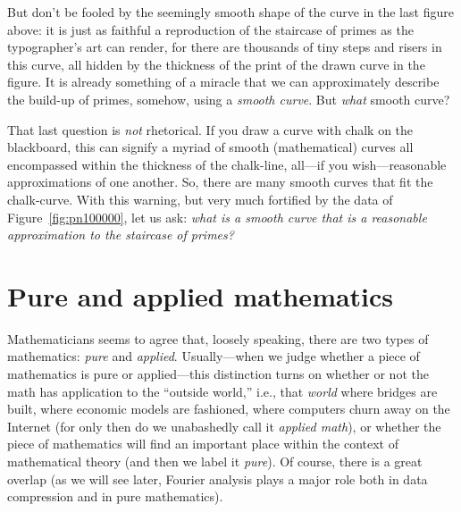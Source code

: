\documentclass[openany]{book}
\theoremstyle{plain}
\theoremstyle{definition}
\begin{document}
But don't be fooled by the seemingly smooth shape of the curve in the
last figure above: it is just as faithful a reproduction of the
staircase of primes as the typographer's art can render, for there are
thousands of tiny steps and risers in this curve, all hidden by the
thickness of the print of the drawn curve in the figure.  It is
already something of a miracle that we can approximately describe the
build-up of primes, somehow, using a {\em smooth curve}.  But {\em
  what} smooth curve?


That last question is {\em not} rhetorical. If you draw a curve with
chalk on the blackboard, this can signify a myriad of smooth
(mathematical) curves all encompassed within the thickness of the
chalk-line, all---if you wish---reasonable approximations of one
another. So, there are many smooth curves that fit the chalk-curve.
With this warning, but very much fortified by the data of Figure~\ref{fig:pn100000},
let us ask: {\em what is a smooth curve that is a reasonable
  approximation to the staircase of primes?}

\chapter{Pure and applied  mathematics}\label{ch:pureapplied}

Mathematicians seems to agree that, loosely speaking, there are two
types of mathematics: {\em pure} and {\em applied}. Usually---when we
judge whether a piece of mathematics is pure or applied---this
distinction turns on whether or not the math has application to the
``outside world,'' i.e., that {\em world} where bridges are built,
where economic models are fashioned, where computers churn away on the
Internet (for only then do we unabashedly call it {\em applied math}),
or whether the piece of mathematics will find an important place
within the context of mathematical theory (and then we label it {\em
  pure}).  Of course, there is a great overlap (as we will see later,
Fourier analysis plays a major role both in data compression and in
pure mathematics).
\end{document}
